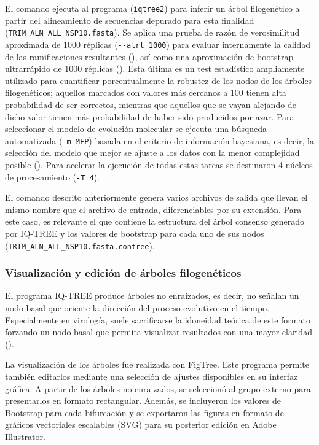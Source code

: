 El comando ejecuta al programa (\lstinline!iqtree2!) para inferir un árbol 
filogenético a partir del alineamiento de secuencias depurado para esta 
finalidad (\lstinline!TRIM_ALN_ALL_NSP10.fasta!). Se aplica una prueba de 
razón de verosimilitud aproximada de 1000 réplicas (\lstinline!--alrt 1000!)
para evaluar internamente la calidad de las ramificaciones resultantes 
(\cite{guindon_new_2010}), así como una aproximación de bootstrap 
ultrarrápido de 1000 réplicas (\cite{hoang_ufboot2_2018}). Esta última es un
test estadístico ampliamente utilizado para cuantificar porcentualmente la 
robustez de los nodos de los árboles filogenéticos; aquellos marcados con 
valores más cercanos a 100 tienen alta probabilidad de ser correctos, 
mientras que aquellos que se vayan alejando de dicho valor tienen más 
probabilidad de  haber sido producidos por azar. Para seleccionar el modelo 
de evolución molecular se ejecuta una búsqueda automatizada 
(\lstinline!-m MFP!) basada en el criterio de información bayesiana, es 
decir, la selección del modelo que mejor se ajuste a los datos con la menor 
complejidad posible (\cite{kalyaanamoorthy_modelfinder_2017}). Para acelerar
la ejecución de todas estas tareas se destinaron 4 núcleos de procesamiento 
(\lstinline!-T 4!).

El comando descrito anteriormente genera varios archivos de salida que 
llevan el mismo nombre que el archivo de entrada, diferenciables por su 
extensión. Para este caso, es relevante el que contiene la estructura del 
árbol consenso generado por IQ-TREE y los valores de bootstrap para cada 
uno de sus nodos (\lstinline!TRIM_ALN_ALL_NSP10.fasta.contree!).

\subsubsection{Visualización y edición de árboles filogenéticos}

El programa IQ-TREE produce árboles no enraizados, es decir, no señalan un 
nodo basal que oriente la dirección del proceso evolutivo en el tiempo. 
Especialmente en virología, suele sacrificarse la idoneidad teórica de este 
formato forzando un nodo basal que permita visualizar resultados con una 
mayor claridad (\cite{gulyaeva_nidovirus_2021,hu_characteristics_2021,ruiz-aravena_ecology_2022}).

La visualización de los árboles fue realizada con FigTree. Este programa 
permite también editarlos mediante una selección de ajustes disponibles en 
su interfaz gráfica. A partir de los árboles no enraizados, se seleccionó al
grupo externo para presentarlos en formato rectangular. Además, se 
incluyeron los valores de Bootstrap para cada bifurcación y se exportaron 
las figuras en formato de gráficos vectoriales escalables (SVG) para su 
posterior edición en Adobe Illustrator.

